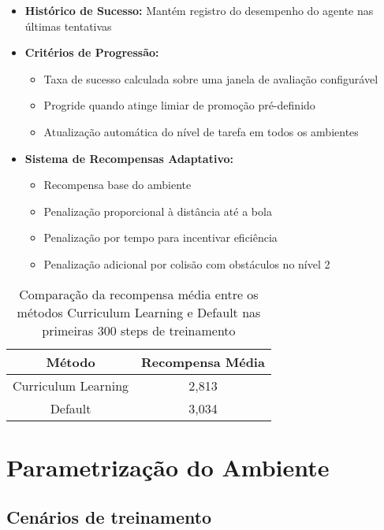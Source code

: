 \begin{itemize}
    \item \textbf{Histórico de Sucesso:} Mantém registro do desempenho do agente nas últimas tentativas

    \item \textbf{Critérios de Progressão:}
    \begin{itemize}
        \item Taxa de sucesso calculada sobre uma janela de avaliação configurável
        \item Progride quando atinge limiar de promoção pré-definido
        \item Atualização automática do nível de tarefa em todos os ambientes
    \end{itemize}

    \item \textbf{Sistema de Recompensas Adaptativo:}
    \begin{itemize}
        \item Recompensa base do ambiente
        \item Penalização proporcional à distância até a bola
        \item Penalização por tempo para incentivar eficiência
        \item Penalização adicional por colisão com obstáculos no nível 2
    \end{itemize}
\end{itemize}

\begin{table}[H]
    \centering
    \begin{tabular}{|c|c|}
        \hline
        \textbf{Método} & \textbf{Recompensa Média} \\
        \hline
        Curriculum Learning & 2,813 \\
        Default & 3,034 \\
        \hline
    \end{tabular}
    \caption{Comparação da recompensa média entre os métodos Curriculum Learning e Default nas primeiras 300 steps de treinamento}
    \label{tab:cl_vs_default}
\end{table}



\section{Parametrização do Ambiente}

\subsection{Cenários de treinamento}

